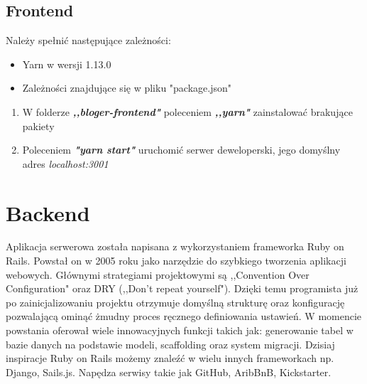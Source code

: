 \documentclass[declaration,shortabstract]{iithesis}
\begin{document}
\subsection{Frontend}
Należy spełnić następujące zależności:
    \begin{itemize}
        \item Yarn w wersji 1.13.0
        \item Zależności znajdujące się w pliku "package.json" 
    \end{itemize}

\begin{enumerate}
    \item W folderze \textbf{\textit{,,bloger-frontend"}} poleceniem \textbf{\textit{,,yarn"}} zainstalować brakujące pakiety
    \item Poleceniem \textbf{\textit{"yarn start"}} uruchomić serwer deweloperski, jego domyślny adres \textit{localhost:3001}
\end{enumerate}

\section{Backend}
Aplikacja serwerowa została napisana z wykorzystaniem frameworka Ruby on Rails. Powstał on w 2005 roku jako narzędzie do szybkiego tworzenia aplikacji webowych. Głównymi strategiami projektowymi są ,,Convention Over Configuration" oraz DRY (,,Don't repeat yourself"). Dzięki temu programista już po zainicjalizowaniu projektu otrzymuje domyślną strukturę oraz konfigurację pozwalającą ominąć żmudny proces ręcznego definiowania ustawień. W momencie powstania oferował wiele innowacyjnych funkcji takich jak: generowanie tabel w bazie danych na podstawie modeli, scaffolding oraz system migracji. Dzisiaj inspiracje Ruby on Rails możemy znaleźć w wielu innych frameworkach np. Django, Sails.js. Napędza serwisy takie jak GitHub, AribBnB, Kickstarter.
\end{document}
